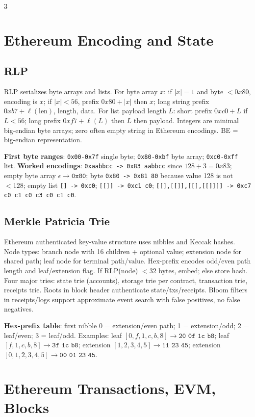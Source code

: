 \documentclass[8pt]{extarticle}
\newcommand{\term}[1]{\textbf{#1}}
\begin{document}
\begin{multicols*}{3}
\section{Ethereum Encoding and State}
\subsection{RLP}
RLP serializes byte arrays and lists. For byte array $x$: if $|x|=1$ and byte $<0x80$, encoding is $x$; if $|x|<56$, prefix $0x80+|x|$ then $x$; long string prefix $0xb7+\ell(\mathrm{len})$, length, data. For list payload length $L$: short prefix $0xc0+L$ if $L<56$; long prefix $0xf7+\ell(L)$ then $L$ then payload. Integers are minimal big-endian byte arrays; zero often empty string in Ethereum encodings. BE = big-endian representation.

\term{First byte ranges}: \texttt{0x00-0x7f} single byte; \texttt{0x80-0xbf} byte array; \texttt{0xc0-0xff} list. \term{Worked encodings}: \texttt{0xaabbcc -> 0x83 aabbcc} since $128+3=0x83$; empty byte array $\epsilon\to\texttt{0x80}$; byte \texttt{0x80 -> 0x81 80} because value 128 is not $<128$; empty list \texttt{[] -> 0xc0}; \texttt{[[]] -> 0xc1 c0}; \texttt{[[],[[]],[[],[[]]]] -> 0xc7 c0 c1 c0 c3 c0 c1 c0}.

\subsection{Merkle Patricia Trie}
Ethereum authenticated key-value structure uses nibbles and Keccak hashes. Node types: branch node with 16 children + optional value; extension node for shared path; leaf node for terminal path/value. Hex-prefix encodes odd/even path length and leaf/extension flag. If RLP(node) $<32$ bytes, embed; else store hash. Four major tries: state trie (accounts), storage trie per contract, transaction trie, receipts trie. Roots in block header authenticate state/txs/receipts. Bloom filters in receipts/logs support approximate event search with false positives, no false negatives.

\term{Hex-prefix table}: first nibble 0 = extension/even path; 1 = extension/odd; 2 = leaf/even; 3 = leaf/odd. Examples: leaf $[0,f,1,c,b,8]\to\texttt{20 0f 1c b8}$; leaf $[f,1,c,b,8]\to\texttt{3f 1c b8}$; extension $[1,2,3,4,5]\to\texttt{11 23 45}$; extension $[0,1,2,3,4,5]\to\texttt{00 01 23 45}$.

\section{Ethereum Transactions, EVM, Blocks}

\end{multicols*}
\end{document}
